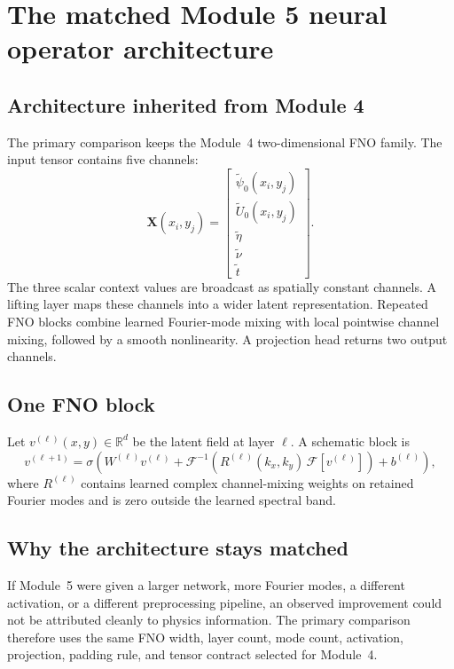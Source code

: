 \documentclass[11pt]{article}
\newcommand{\mat}[1]{\bm{#1}}
\newcommand{\FFT}{\mathcal{F}}
\newcommand{\IFFT}{\mathcal{F}^{-1}}
\begin{document}
\section{The matched Module 5 neural operator architecture}
\label{sec:architecture}

\subsection{Architecture inherited from Module 4}
The primary comparison keeps the Module~4 two-dimensional FNO family. The input tensor contains five channels:
\begin{equation}
\mat X(x_i,y_j)=
\begin{bmatrix}
\widetilde\psi_0(x_i,y_j)\\
\widetilde U_0(x_i,y_j)\\
\widetilde\eta\\
\widetilde\nu\\
\widetilde t
\end{bmatrix}.
\end{equation}
The three scalar context values are broadcast as spatially constant channels. A lifting layer maps these channels into a wider latent representation. Repeated FNO blocks combine learned Fourier-mode mixing with local pointwise channel mixing, followed by a smooth nonlinearity. A projection head returns two output channels.

\subsection{One FNO block}
Let $v^{(\ell)}(x,y)\in\mathbb{R}^{d}$ be the latent field at layer $\ell$. A schematic block is
\begin{equation}
v^{(\ell+1)}
=\sigma\!\left(
W^{(\ell)}v^{(\ell)}
+\IFFT\left(R^{(\ell)}(k_x,k_y)\,\FFT[v^{(\ell)}]\right)
+b^{(\ell)}
\right),
\label{eq:fno_block}
\end{equation}
where $R^{(\ell)}$ contains learned complex channel-mixing weights on retained Fourier modes and is zero outside the learned spectral band.

\subsection{Why the architecture stays matched}
If Module~5 were given a larger network, more Fourier modes, a different activation, or a different preprocessing pipeline, an observed improvement could not be attributed cleanly to physics information. The primary comparison therefore uses the same FNO width, layer count, mode count, activation, projection, padding rule, and tensor contract selected for Module~4.
\end{document}
